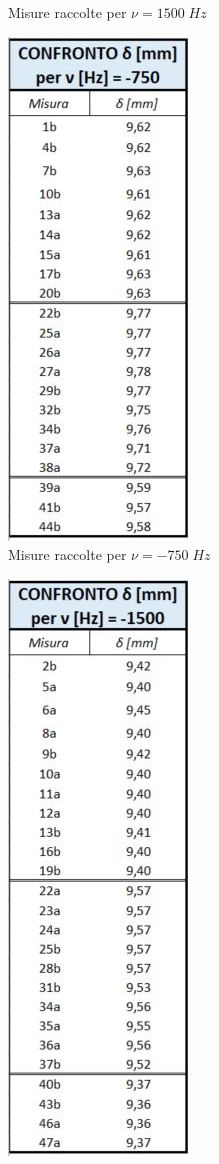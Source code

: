 \documentclass{article}
\begin{document}
\begin{figure}[h]
\begin{subfigure}[h]{0.2\textwidth}
        \caption{Misure raccolte per $\nu=1500 \; Hz$}
        \label{Tab_1500}
    \end{subfigure}
    \hfill
    \begin{subfigure}[h]{0.2\linewidth}
        \centering
        \includegraphics{Coerenza_T3.JPG}
        \caption{Misure raccolte per $\nu=-750 \; Hz$}
        \label{Tab_-750}        
    \end{subfigure}
    \hfill
    \begin{subfigure}[h]{0.2\linewidth}
        \centering
        \includegraphics{Coerenza_T4.JPG}

\end{subfigure}
\end{figure}
\end{document}
